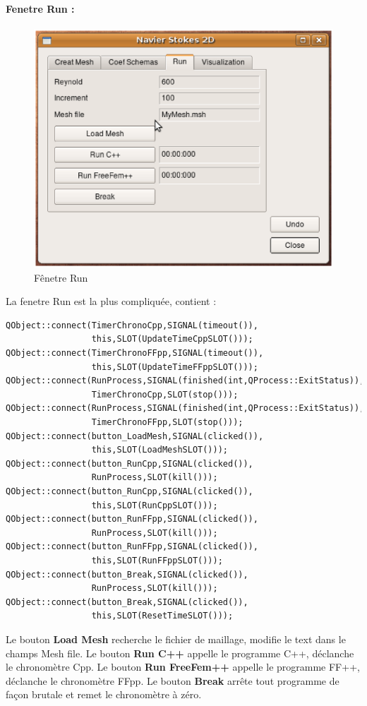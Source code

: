 \documentclass{book}
\begin{document}
\paragraph{Fenetre Run :}
\begin{center}
\begin{figure}[h]
 \includegraphics[scale=0.50]{Run}
 \caption{Fênetre Run} 
\end{figure}
\end{center}
La fenetre Run est la plus compliquée, contient :
\begin{lstlisting}
QObject::connect(TimerChronoCpp,SIGNAL(timeout()),
                 this,SLOT(UpdateTimeCppSLOT()));
QObject::connect(TimerChronoFFpp,SIGNAL(timeout()),
                 this,SLOT(UpdateTimeFFppSLOT()));
QObject::connect(RunProcess,SIGNAL(finished(int,QProcess::ExitStatus)),
                 TimerChronoCpp,SLOT(stop()));
QObject::connect(RunProcess,SIGNAL(finished(int,QProcess::ExitStatus)),
                 TimerChronoFFpp,SLOT(stop()));
QObject::connect(button_LoadMesh,SIGNAL(clicked()),
                 this,SLOT(LoadMeshSLOT()));
QObject::connect(button_RunCpp,SIGNAL(clicked()),
                 RunProcess,SLOT(kill()));
QObject::connect(button_RunCpp,SIGNAL(clicked()),
                 this,SLOT(RunCppSLOT()));
QObject::connect(button_RunFFpp,SIGNAL(clicked()),
                 RunProcess,SLOT(kill()));
QObject::connect(button_RunFFpp,SIGNAL(clicked()),
                 this,SLOT(RunFFppSLOT()));
QObject::connect(button_Break,SIGNAL(clicked()),
                 RunProcess,SLOT(kill()));
QObject::connect(button_Break,SIGNAL(clicked()),
                 this,SLOT(ResetTimeSLOT()));
\end{lstlisting}
Le bouton \textbf{Load Mesh} recherche le fichier de maillage, modifie le text dans le champs Mesh file. Le bouton \textbf{Run C++} appelle le programme C++, déclanche le chronomètre Cpp. Le bouton \textbf{Run FreeFem++} appelle le programme FF++, déclanche le chronomètre FFpp. Le bouton \textbf{Break} arrête tout programme de façon brutale et remet le chronomètre à zéro.
\end{document}

